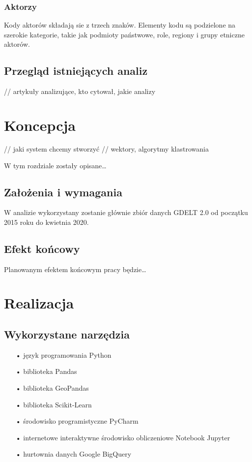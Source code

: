 \documentclass[11pt]{report}
\begin{document}
    \subsection{Aktorzy}
    Kody aktorów składają sie z trzech znaków.
    Elementy kodu są podzielone na szerokie kategorie, takie jak podmioty państwowe, role, regiony i grupy etniczne aktorów.


    \section{Przegląd istniejących analiz} \label{ch:przeglad}
    // artykuły analizujące, kto cytował, jakie analizy


    \chapter{Koncepcja}
    // jaki system chcemy stworzyć
    // wektory, algorytmy klastrowania

    W tym rozdziale zostały opisane\ldots


    \section{Założenia i wymagania}
    W analizie wykorzystany zostanie głównie zbiór danych GDELT 2.0 od początku 2015 roku do kwietnia 2020.


    \section{Efekt końcowy}
    Planowanym efektem końcowym pracy będzie\ldots


    \chapter{Realizacja}


    \section{Wykorzystane narzędzia}

    \begin{enumerate}
        \item[•] język programowania Python~\cite{python}
        \item[•] biblioteka Pandas~\cite{pandas}
        \item[•] biblioteka GeoPandas~\cite{geopandas}
        \item[•] biblioteka Scikit-Learn~\cite{scikit}
        \item[•] środowisko programistyczne PyCharm~\cite{pycharm}
        \item[•] internetowe interaktywne środowisko obliczeniowe Notebook Jupyter~\cite{jupyter}
        \item[•] hurtownia danych Google BigQuery~\cite{bigquery}
    \end{enumerate}
\end{document}
